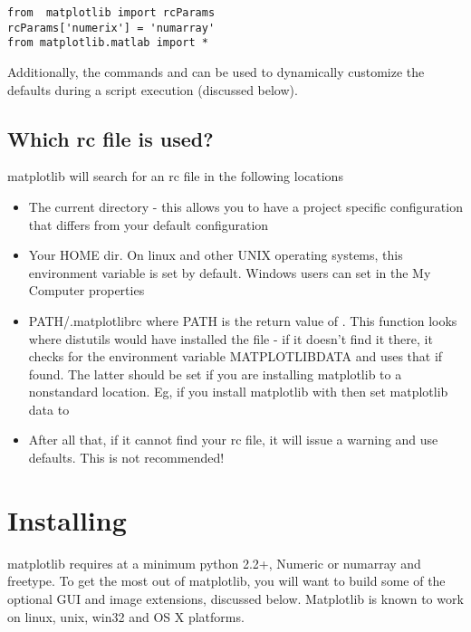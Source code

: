 \documentclass[]{book}
\begin{document}
\begin{lstlisting}
from  matplotlib import rcParams
rcParams['numerix'] = 'numarray'
from matplotlib.matlab import *
\end{lstlisting}

\noindent Additionally, the commands  and
 can be used to dynamically customize
the defaults during a script execution (discussed below).

\subsection{Which rc file is used?}

matplotlib will search for an rc file in the following locations

\begin{itemize}
\item The current directory - this allows you to have a project
  specific configuration that differs from your default configuration

\item Your HOME dir.  On linux and other UNIX operating systems, this
  environment variable is set by default.  Windows users can set in
  the My Computer properties
  
\item PATH/.matplotlibrc where PATH is the return value of
  .  This function looks where
  distutils would have installed the file - if it doesn't find it
  there, it checks for the environment variable MATPLOTLIBDATA and
  uses that if found.  The latter should be set if you are installing
  matplotlib to a nonstandard location.  Eg, if you install matplotlib
  with  then set
  matplotlib data to 

\item After all that, if it cannot find your rc file, it will issue a
  warning and use defaults.  This is not recommended!
\end{itemize}


\section{Installing}
\label{sec:installing}

matplotlib requires at a minimum python 2.2+, Numeric or numarray and
freetype.  To get the most out of matplotlib, you will want to build
some of the optional GUI and image extensions, discussed below.
Matplotlib is known to work on linux, unix, win32 and OS X platforms.
\end{document}
